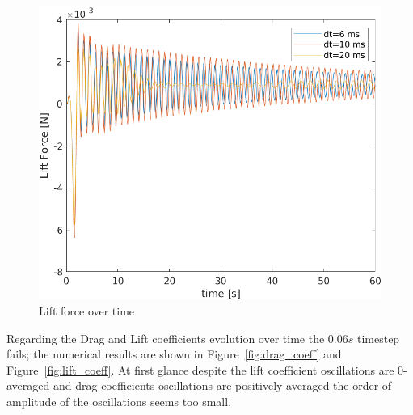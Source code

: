 \documentclass[12pt]{article}
\begin{document}
        \begin{figure}[!ht]
                \includegraphics[width=\textwidth]{LiftForce.png}
                \centering
                \caption{Lift force over time}
                \label{fig:lift}
        \end{figure}

        Regarding the Drag and Lift coefficients evolution over time the $0.06 s$ timestep fails; the numerical results are shown in Figure~\ref{fig:drag_coeff} and  Figure~\ref{fig:lift_coeff}. At first glance despite the lift coefficient oscillations are 0-averaged and drag coefficients oscillations are positively averaged the order of amplitude of the oscillations seems too small. 
\end{document}
